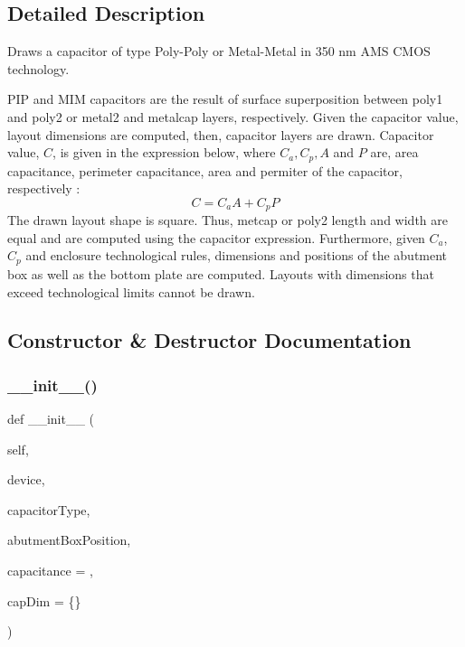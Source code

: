 \subsection{Detailed Description}
Draws a capacitor of type Poly-\/\+Poly or Metal-\/\+Metal in 350 nm A\+MS C\+M\+OS technology. 

P\+IP and M\+IM capacitors are the result of surface superposition between poly1 and poly2 or metal2 and metalcap layers, respectively. Given the capacitor value, layout dimensions are computed, then, capacitor layers are drawn. Capacitor value, $C$, is given in the expression below, where $ C_{a}, C_{p}, A $ and $ P $ are, area capacitance, perimeter capacitance, area and permiter of the capacitor, respectively \+: \[ C = C_{a}A + C_{p}P \] The drawn layout shape is square. Thus, metcap or poly2 length and width are equal and are computed using the capacitor expression. Furthermore, given $ C_{a} $, $ C_{p} $ and enclosure technological rules, dimensions and positions of the abutment box as well as the bottom plate are computed. Layouts with dimensions that exceed technological limits cannot be drawn. 

\subsection{Constructor \& Destructor Documentation}
\mbox{\label{classpython_1_1capacitorunit_1_1CapacitorUnit_ae3f080385324a5f7e92d5fa9d99dc8d4}} 
\subsubsection{\texorpdfstring{\+\_\+\+\_\+init\+\_\+\+\_\+()}{\_\_init\_\_()}}
{\footnotesize\ttfamily def \+\_\+\+\_\+init\+\_\+\+\_\+ (\begin{DoxyParamCaption}\item[{}]{self,  }\item[{}]{device,  }\item[{}]{capacitor\+Type,  }\item[{}]{abutment\+Box\+Position,  }\item[{}]{capacitance = {},  }\item[{}]{cap\+Dim = {\ttfamily \{\}} }\end{DoxyParamCaption})}



